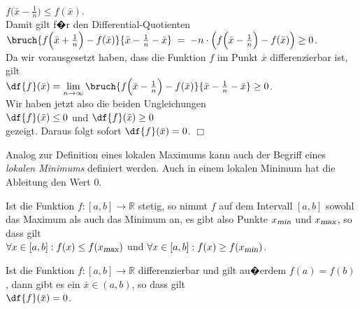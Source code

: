 \\[0.3cm]
\hspace*{1.3cm} $f\bigl(\bar{x} - \frac{1}{n}\bigr) \leq f(\bar{x})$. 
\\[0.3cm]
Damit gilt f�r den Differential-Quotienten
\\[0.3cm]
\hspace*{1.3cm}
$\bruch{f\Bigl(\bar{x} + \frac{1}{n}\Bigr) - f(\bar{x})}{\bar{x} - \frac{1}{n} - \bar{x}} \;=\;
 - n \cdot \left(f\Bigl(\bar{x} - \frac{1}{n}\Bigr) - f(\bar{x})\right) \geq 0$. 
\\[0.3cm]
Da wir vorausgesetzt haben, dass die Funktion $f$ im Punkt $\bar{x}$ differenzierbar ist,
gilt 
\\[0.3cm]
\hspace*{1.3cm}
$\df{f}(\bar{x}) = \lim\limits_{n \rightarrow \infty} \bruch{f\Bigl(\bar{x} - \frac{1}{n}\Bigr) - f(\bar{x})}{\bar{x} - \frac{1}{n} - \bar{x}} \geq 0$.
\\[0.3cm]
Wir haben jetzt also die beiden Ungleichungen 
\\[0.3cm]
\hspace*{1.3cm}
$\df{f}(\bar{x}) \leq 0$ \quad und \quad $\df{f}(\bar{x}) \geq 0$ 
\\[0.3cm]
gezeigt.  Daraus folgt sofort $\df{f}(\bar{x}) = 0$. \hspace*{\fill} $\Box$
\vspace*{0.3cm}

\noindent
Analog zur Definition eines lokalen Maximums kann auch der Begriff eines \emph{lokalen Minimums}
definiert werden.  Auch in einem lokalen Minimum hat die Ableitung den Wert 0.

\begin{Satz}
 Ist die Funktion $f:[a,b] \rightarrow \mathbb{R}$ stetig, so nimmt $f$ auf dem Intervall
 $[a,b]$ sowohl das Maximum als auch das Minimum an, es gibt also Punkte
 $x_{\textsl{\footnotesize min}}$ und  $x_{\textsl{\footnotesize max}}$, so dass gilt 
 \\[0.2cm]
 \hspace*{1.3cm}
 $\forall x \in [a,b]: f(x) \leq f(x_{\textsl{\footnotesize max}})$ \quad und \quad $\forall x \in [a,b]: f(x) \geq f(x_{\textsl{\footnotesize min}})$.
\eox
\end{Satz}


\begin{Satz}
  Ist die Funktion \mbox{$f:[a,b]\rightarrow \mathbb{R}$} differenzierbar und gilt au�er\-dem $f(a) = f(b)$, dann gibt es ein
  $\bar{x} \in (a,b)$, so dass gilt 
  \\[0.3cm]
  \hspace*{1.3cm}
  $\df{f}(\bar{x}) = 0$.  
\end{Satz}

